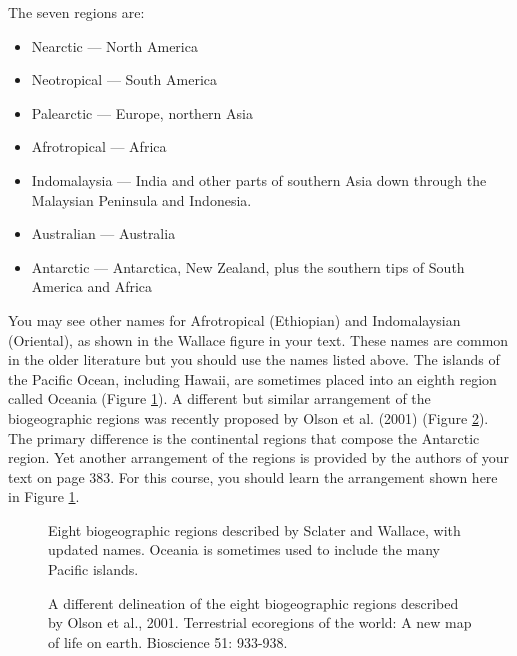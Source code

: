 \documentclass[11pt, oneside]{article}   	%
\begin{document}
The seven regions are: 

\begin{itemize}
\item Nearctic --- North America
\item Neotropical --- South America
\item Palearctic --- Europe, northern Asia
\item Afrotropical --- Africa
\item Indomalaysia --- India and other parts of southern Asia down through the Malaysian Peninsula and Indonesia.
\item Australian --- Australia
\item Antarctic --- Antarctica, New Zealand, plus the southern tips of South America and Africa
\end{itemize}

You may see other names for Afrotropical (Ethiopian) and Indomalaysian (Oriental), as shown in the Wallace figure in your text.  These names are common in the older literature but you should use the names listed above. The islands of the Pacific Ocean, including Hawaii, are sometimes placed into an eighth region called Oceania (Figure \ref{biogeoregions}). A different but similar arrangement of the biogeographic regions was recently proposed by Olson  et al. (2001) (Figure \ref{Olson Biogeo Regions}). The primary difference is the continental regions that compose the Antarctic region.  Yet another arrangement of the regions is provided by the authors of your text on page 383.  For this course, you should learn the arrangement shown here in Figure \ref{biogeoregions}.

\begin{figure}[tb]
	\centering
		\caption{Eight biogeographic regions described by Sclater and Wallace, with updated names.  Oceania is sometimes used to include the many Pacific islands.\label{biogeoregions}}
		
\end{figure}

\begin{figure}[tb]
	\centering
		\caption{A different delineation of the eight biogeographic regions described by Olson et al., 2001. Terrestrial ecoregions of the world: A new map of life on earth. Bioscience 51: 933-938.\label{Olson Biogeo Regions}}
		
\end{figure}
\end{document}
